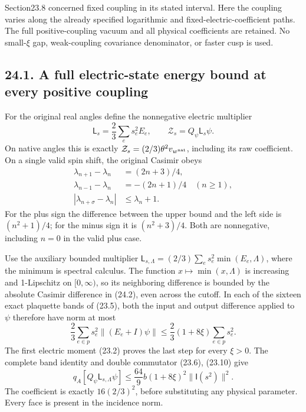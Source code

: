 \documentclass[
]{article}
\begin{document}
Section23.8 concerned fixed coupling in its stated interval. Here the
coupling varies along the already specified logarithmic and
fixed-electric-coefficient paths. The full positive-coupling vacuum and
all physical coefficients are retained. No small-\(\xi\) gap,
weak-coupling covariance denominator, or faster cusp is used.

\subsection{24.1. A full electric-state energy bound at every positive
coupling}\label{a-full-electric-state-energy-bound-at-every-positive-coupling}

For the original real angles define the nonnegative electric multiplier
\[
\mathsf L_s=\frac23\sum_es_e^2E_e,\qquad
\mathcal Z_s=Q_\psi\mathsf L_s\psi .
\tag{24.1}
\] On native angles this is exactly
\(\mathcal Z_s=(2/3)\theta^2v_{w^{\rm nat}}\), including its raw
coefficient. On a single valid spin shift, the original Casimir obeys \[
\begin{aligned}
\lambda_{n+1}-\lambda_n&=(2n+3)/4,\\
\lambda_{n-1}-\lambda_n&=-(2n+1)/4\quad(n\ge1),\\
|\lambda_{n+\sigma}-\lambda_n|&\le\lambda_n+1 .
\end{aligned}\tag{24.2}
\] For the plus sign the difference between the upper bound and the left
side is \((n^2+1)/4\); for the minus sign it is \((n^2+3)/4\). Both are
nonnegative, including \(n=0\) in the valid plus case.

Use the auxiliary bounded multiplier
\(\mathsf L_{s,\Lambda}=(2/3)\sum_es_e^2\min(E_e,\Lambda)\), where the
minimum is spectral calculus. The function \(x\mapsto\min(x,\Lambda)\)
is increasing and 1-Lipschitz on \([0,\infty)\), so its neighboring
difference is bounded by the absolute Casimir difference in (24.2), even
across the cutoff. In each of the sixteen exact plaquette bands of
(23.5), both the input and output difference applied to \(\psi\)
therefore have norm at most \[
\frac23\sum_{e\in p}s_e^2\|(E_e+I)\psi\|
\le\frac23(1+8\xi)\sum_{e\in p}s_e^2 .
\] The first electric moment (23.2) proves the last step for every
\(\xi>0\). The complete band identity and double commutator (23.6),
(23.10) give \[
q_A[Q_\psi\mathsf L_{s,\Lambda}\psi]
 \le\frac{64}{9}b(1+8\xi)^2\|\mathsf I(s^2)\|^2 .
\tag{24.3}
\] The coefficient is exactly \(16(2/3)^2\), before substituting any
physical parameter. Every face is present in the incidence norm.
\end{document}

